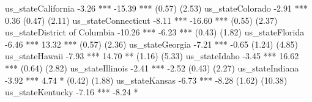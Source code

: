 us_stateCalifornia                                             -3.26 ***    -15.39 ***                              
                                                               (0.57)        (2.53)                                 
us_stateColorado                                               -2.91 ***      0.36                                  
                                                               (0.47)        (2.11)                                 
us_stateConnecticut                                            -8.11 ***    -16.60 ***                              
                                                               (0.55)        (2.37)                                 
us_stateDistrict of Columbia                                  -10.26 ***     -6.23 ***                              
                                                               (0.43)        (1.82)                                 
us_stateFlorida                                                -6.46 ***     13.32 ***                              
                                                               (0.57)        (2.36)                                 
us_stateGeorgia                                                -7.21 ***     -0.65                                  
                                                               (1.24)        (4.85)                                 
us_stateHawaii                                                 -7.93 ***     14.70 **                               
                                                               (1.16)        (5.33)                                 
us_stateIdaho                                                  -3.45 ***     16.62 ***                              
                                                               (0.64)        (2.82)                                 
us_stateIllinois                                               -2.41 ***     -2.52                                  
                                                               (0.43)        (2.27)                                 
us_stateIndiana                                                -3.92 ***      4.74 *                                
                                                               (0.42)        (1.88)                                 
us_stateKansas                                                 -6.73 ***     -8.28                                  
                                                               (1.62)       (10.38)                                 
us_stateKentucky                                               -7.16 ***     -8.24 *                                
